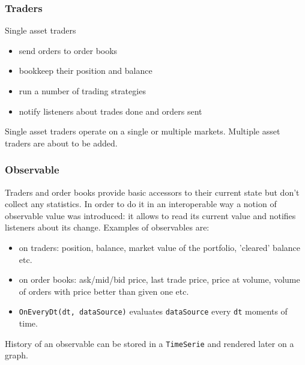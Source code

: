 \documentclass{beamer}
\begin{document}
\begin{frame}
\frametitle{Traders}
Single asset traders
\begin{itemize}
  \item send orders to order books
  \item bookkeep their position and balance
  \item run a number of trading strategies
  \item notify listeners about trades done and orders sent
\end{itemize}
Single asset traders operate on a single or multiple markets.
Multiple asset traders are about to be added.
\end{frame}
\begin{frame}
\frametitle{Observable}
Traders and order books provide basic accessors to their current state but don't collect any statistics. In order to do it in an interoperable way a notion of observable value was introduced: it allows to read its current value and notifies listeners about its change. Examples of observables are:
\begin{itemize}
    \item on traders: position, balance, market value of the portfolio, 'cleared' balance etc.
    \item on order books: ask/mid/bid price, last trade price, price at volume, volume of orders with price better than given one etc.
    \item \texttt{OnEveryDt(dt, dataSource)} evaluates \texttt{dataSource} every \texttt{dt} moments of time.
\end{itemize}
History of an observable can be stored in a \texttt{TimeSerie} and rendered later on a graph.
\end{frame}
\end{document}
